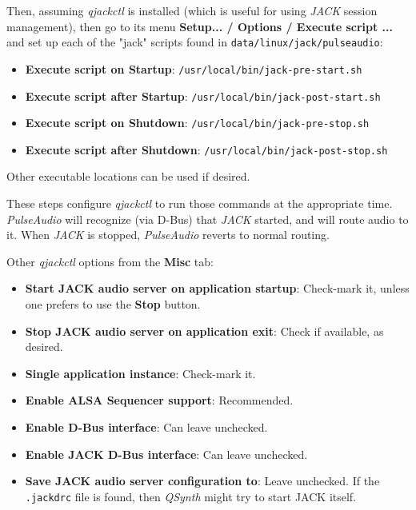    Then, assuming \textsl{qjackctl} is installed (which is useful for using
   \textsl{JACK} session management), then go to its menu
   \textbf{Setup... / Options / Execute script ...} and set up each of the
   "jack" scripts found in \texttt{data/linux/jack/pulseaudio}:

   \begin{itemize}
      \item \textbf{Execute script on Startup}:
         \texttt{/usr/local/bin/jack-pre-start.sh}
      \item \textbf{Execute script after Startup}:
         \texttt{/usr/local/bin/jack-post-start.sh}
      \item \textbf{Execute script on Shutdown}:
         \texttt{/usr/local/bin/jack-pre-stop.sh}
      \item \textbf{Execute script after Shutdown}:
         \texttt{/usr/local/bin/jack-post-stop.sh}
   \end{itemize}

   Other executable locations can be used if desired.

   These steps configure \textsl{qjackctl} to run those commands at
   the appropriate time.
   \textsl{PulseAudio} will recognize (via D-Bus) that \textsl{JACK} started,
   and will route audio to it. When \textsl{JACK} is stopped,
   \textsl{PulseAudio} reverts to normal routing.

   Other \textsl{qjackctl} options from the \textbf{Misc} tab:

   \begin{itemize}
      \item \textbf{Start JACK audio server on application startup}:
         Check-mark it, unless one prefers to use the \textbf{Stop} button.
      \item \textbf{Stop JACK audio server on application exit}:
         Check if available, as desired.
      \item \textbf{Single application instance}:
         Check-mark it.
      \item \textbf{Enable ALSA Sequencer support}:
         Recommended.
      \item \textbf{Enable D-Bus interface}:
         Can leave unchecked.
      \item \textbf{Enable JACK D-Bus interface}:
         Can leave unchecked.
      \item \textbf{Save JACK audio server configuration to}:
         Leave unchecked.  If the \texttt{.jackdrc} file is found, then
         \textsl{QSynth} might try to start JACK itself.
   \end{itemize}


